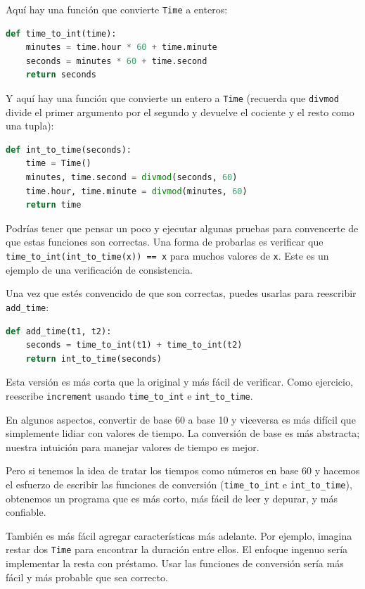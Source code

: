 Aquí hay una función que convierte \texttt{Time} a enteros:

\begin{lstlisting}[language=Python]
def time_to_int(time):
    minutes = time.hour * 60 + time.minute
    seconds = minutes * 60 + time.second
    return seconds
\end{lstlisting}

Y aquí hay una función que convierte un entero a \texttt{Time} (recuerda que \texttt{divmod} divide el primer argumento por el segundo y devuelve el cociente y el resto como una tupla):

\begin{lstlisting}[language=Python]
def int_to_time(seconds):
    time = Time()
    minutes, time.second = divmod(seconds, 60)
    time.hour, time.minute = divmod(minutes, 60)
    return time
\end{lstlisting}

Podrías tener que pensar un poco y ejecutar algunas pruebas para convencerte de que estas funciones son correctas. Una forma de probarlas es verificar que \texttt{time\_to\_int(int\_to\_time(x)) == x} para muchos valores de \texttt{x}. Este es un ejemplo de una verificación de consistencia.

Una vez que estés convencido de que son correctas, puedes usarlas para reescribir \texttt{add\_time}:

\begin{lstlisting}[language=Python]
def add_time(t1, t2):
    seconds = time_to_int(t1) + time_to_int(t2)
    return int_to_time(seconds)
\end{lstlisting}

Esta versión es más corta que la original y más fácil de verificar. Como ejercicio, reescribe \texttt{increment} usando \texttt{time\_to\_int} e \texttt{int\_to\_time}.

En algunos aspectos, convertir de base 60 a base 10 y viceversa es más difícil que simplemente lidiar con valores de tiempo. La conversión de base es más abstracta; nuestra intuición para manejar valores de tiempo es mejor.

Pero si tenemos la idea de tratar los tiempos como números en base 60 y hacemos el esfuerzo de escribir las funciones de conversión (\texttt{time\_to\_int} e \texttt{int\_to\_time}), obtenemos un programa que es más corto, más fácil de leer y depurar, y más confiable.

También es más fácil agregar características más adelante. Por ejemplo, imagina restar dos \texttt{Time} para encontrar la duración entre ellos. El enfoque ingenuo sería implementar la resta con préstamo. Usar las funciones de conversión sería más fácil y más probable que sea correcto.

